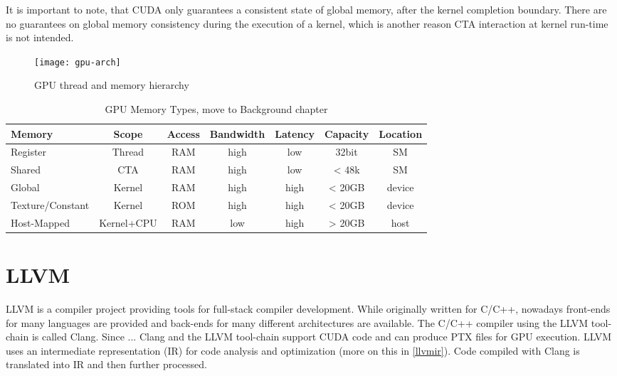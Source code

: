 It is important to note, that CUDA only guarantees a consistent state of global memory, after the kernel completion 
boundary. There are no guarantees on global memory consistency during the execution of a kernel, which is another reason
CTA interaction at kernel run-time is not intended.
\begin{figure}[t]
	\centering
	\texttt{[image: gpu-arch]}
	\caption{GPU thread and memory hierarchy}
	\label{gpu-hier}
\end{figure}
\begin{table}
	\centering
	\begin{tabular}{|l|c|c|c|c|c|c|}
		\hline 
		\textbf{Memory} & \textbf{Scope} & \textbf{Access} & \textbf{Bandwidth} & \textbf{Latency} & \textbf{Capacity} & \textbf{Location} \\ 
		\hline
		\hline
		Register  & Thread & RAM & high & low & 32bit & SM \\ 
		Shared  & CTA & RAM & high & low & < 48k & SM \\ 
		Global  & Kernel & RAM & high & high & < 20GB & device \\ 
		Texture/Constant & Kernel & ROM & high & high & < 20GB & device \\ 
		Host-Mapped  & Kernel+CPU & RAM & low & high & > 20GB & host \\ 
		\hline 
	\end{tabular} 
	\caption{GPU Memory Types, move to Background chapter}
	\label{GPUMemTable}
\end{table}
\section{LLVM}
LLVM is a compiler project providing tools for full-stack compiler development. While originally written for C/C++, nowadays front-ends for many languages are provided and back-ends for many different architectures are available. The C/C++ compiler using the LLVM tool-chain is called Clang. Since ... Clang and the LLVM
tool-chain support CUDA code and can produce PTX files for GPU execution. 
LLVM uses an intermediate representation (IR) for code analysis and optimization (more on this in \ref{llvmir}). Code compiled with
Clang is translated into IR and then further processed. 

